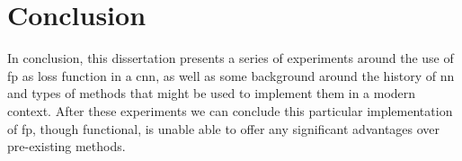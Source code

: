 \chapter{Conclusion}

In conclusion, this dissertation presents a series of experiments around the use of \gls{fp} as loss function in a \gls{cnn}, as well as some background around the history of \gls{nn} and types of methods that might be used to implement them in a modern context. After these experiments we can conclude this particular implementation of \gls{fp}, though functional, is unable able to offer any significant advantages over pre-existing methods. 